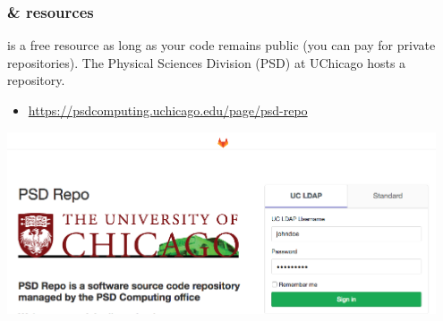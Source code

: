 \documentclass[hyperref={colorlinks=true}]{beamer}
\begin{document}
\begin{frame}%
  \frametitle{\github \& \gitlab resources }
  
  \github is a free resource as long as your code remains public (you can pay for private repositories). The Physical Sciences Division (PSD) at UChicago hosts a  \gitlab repository.

  \begin{itemize}
    \item \url{https://psdcomputing.uchicago.edu/page/psd-repo}
  \end{itemize}
  
  \includegraphics[width=0.95\textwidth]{../Lecture1/PSDRepo.png}

\end{frame}

\end{document}
